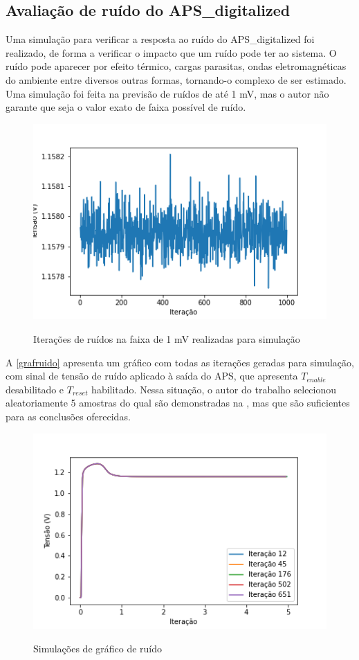 \subsection{Avaliação de ruído do APS\_digitalized}

Uma simulação para verificar a resposta ao ruído do APS\_digitalized foi realizado, de forma a verificar o impacto que um ruído pode ter ao sistema. O ruído pode aparecer por efeito térmico, cargas parasitas, ondas eletromagnéticas do ambiente entre diversos outras formas, tornando-o complexo de ser estimado. Uma simulação foi feita na previsão de ruídos de até 1 mV, mas o autor não garante que seja o valor exato de faixa possível de ruído.

\begin{figure}[htb]
 \centering
    \caption{Iterações de ruídos na faixa de 1 mV realizadas para simulação} 
    \includegraphics[scale=0.5]{Resultados/Graficos/ruido-Vout_noise.png}
    \label{grafruido}
\end{figure}

A \autoref{grafruido} apresenta um gráfico com todas as iterações geradas para simulação, com sinal de tensão de ruído aplicado à saída do APS, que apresenta $T_{enable}$ desabilitado e $T_{reset}$ habilitado. Nessa situação, o autor do trabalho selecionou aleatoriamente 5 amostras do qual são demonstradas na , mas que são suficientes para as conclusões oferecidas.

\begin{figure}[htb]
 \centering
    \caption{Simulações de gráfico de ruído} 
    \includegraphics[scale=0.5]{Resultados/Graficos/tb_pixel_TRAN_NOISE.png}
    \label{grafruido2}
\end{figure}

